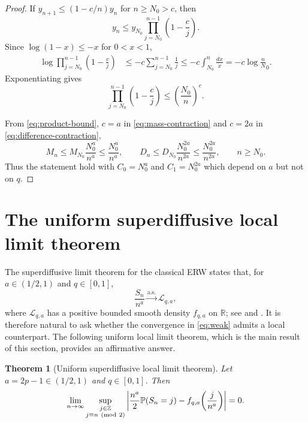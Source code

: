 \documentclass[11pt]{article}
\numberwithin{equation}{section}
\newtheorem{theorem}{Theorem}[section]
\theoremstyle{remark}
\newcommand{\Pp}{\mathbb{P}}
\newcommand{\R}{\mathbb{R}}
\newcommand{\Z}{\mathbb{Z}}
\begin{document}
\begin{proof}
If $y_{n+1}\leq(1-c/n)y_n$ for $n\geq N_0 >c$, then
\[
 y_n\leq y_{N_0}\prod_{j=N_0}^{n-1}\left(1-\frac cj\right).
\]
Since $\log(1-x)\leq-x$ for $0<x<1$,
\begin{align*}
 \log\prod_{j=N_0}^{n-1}\left(1-\frac cj\right)
 &\leq-c\sum_{j=N_0}^{n-1}\frac1j
 \leq-c\int_{N_0}^n\frac{dx}{x}
 =-c\log\frac nN_0.
\end{align*}
Exponentiating gives
\begin{equation}\label{eq:product-bound}
 \prod_{j=N_0}^{n-1}\left(1-\frac cj\right)\leq\left(\frac{N_0}{n}\right)^c.
\end{equation}

From \eqref{eq:product-bound}, $c=a$ in
\eqref{eq:mass-contraction} and
$c = 2a$ in \eqref{eq:difference-contraction}, 
\[
 M_n\leq M_{N_0} \frac{N_0^a}{n^a} \le \frac{N_0^a}{n^a}, \qquad
 D_n\leq D_{N_0} \frac{N_0^{2a}}{n^{2a}} \le \frac{N_0^{2a}}{n^{2a}},
 \qquad n\geq N_0.
\]
Thus the statement hold with $C_0 = N_0^a$ and $C_1 = N_0^{2a}$ which depend on $a$ but not on $q$.
\end{proof}

\section{The uniform superdiffusive local limit theorem}

The superdiffusive limit theorem for the classical ERW states
that, for $a\in(1/2,1)$ and $q\in[0,1]$,
\begin{equation}\label{eq:weak}
 \frac{S_n}{n^a}\xrightarrow{\mathrm{a.s.}} \mathcal{L}_{q,a},
\end{equation}
where $\mathcal{L}_{q,a}$ has a positive bounded smooth density $f_{q,a}$ on $\R$; see
\cite{baur-bertoin,bercu} and
\cite[Theorem 1.3]{guerin-laulin-raschel}. It is therefore natural to ask whether the convergence in \eqref{eq:weak} admits a local
counterpart. The following uniform local limit theorem, which is the main result of this section, provides an affirmative answer.

\smallskip

\begin{theorem}[Uniform superdiffusive local limit theorem]\label{thm:llt}
Let $a=2p-1\in(1/2,1)$ and $q\in[0,1]$. Then
\begin{equation}\label{eq:llt}
\lim_{n\to \infty} \sup_{\substack{j\in\Z\\ j\equiv n\ ({\rm mod}\ 2)}}
 \left|\frac{n^a}{2}\Pp(S_n=j)-f_{q,a}\!\left(\frac{j}{n^a}\right)\right|
 = 0.
\end{equation}
\end{theorem}
\end{document}
